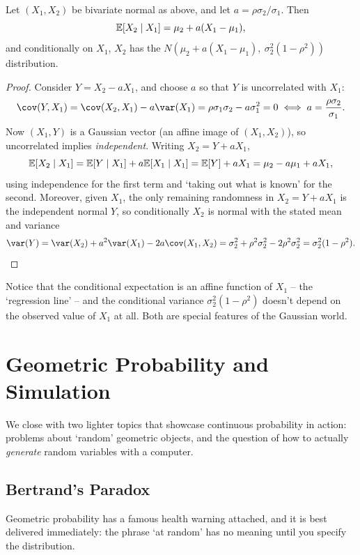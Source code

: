 \documentclass[a4paper]{scrartcl}
\begin{document}
\begin{proposition}
	Let $(X_1, X_2)$ be bivariate normal as above, and let $a = \rho\sigma_2/\sigma_1$. Then
	$$
	\mathbb{E}[X_2 \mid X_1] = \mu_2 + a(X_1 - \mu_1),
	$$
	and conditionally on $X_1$, $X_2$ has the $N\!\left(\mu_2 + a(X_1 - \mu_1),\ \sigma_2^2(1 - \rho^2)\right)$ distribution.
\end{proposition}
\begin{proof}
	Consider $Y = X_2 - aX_1$, and choose $a$ so that $Y$ is uncorrelated with $X_1$:
	$$
	\cov(Y, X_1) = \cov(X_2, X_1) - a\var(X_1) = \rho\sigma_1\sigma_2 - a\sigma_1^2 = 0 \iff a = \frac{\rho\sigma_2}{\sigma_1}.
	$$
	Now $(X_1, Y)$ is a Gaussian vector (an affine image of $(X_1, X_2)$), so uncorrelated implies \emph{independent}. Writing $X_2 = Y + aX_1$,
	$$
	\mathbb{E}[X_2 \mid X_1] = \mathbb{E}[Y \mid X_1] + a\mathbb{E}[X_1 \mid X_1] = \mathbb{E}[Y] + aX_1 = \mu_2 - a\mu_1 + aX_1,
	$$
	using independence for the first term and `taking out what is known' for the second. Moreover, given $X_1$, the only remaining randomness in $X_2 = Y + aX_1$ is the independent normal $Y$, so conditionally $X_2$ is normal with the stated mean and variance
	$$
	\var(Y) = \var(X_2) + a^2\var(X_1) - 2a\cov(X_1, X_2) = \sigma_2^2 + \rho^2\sigma_2^2 - 2\rho^2\sigma_2^2 = \sigma_2^2(1 - \rho^2). \qedhere
	$$
\end{proof}

Notice that the conditional expectation is an affine function of $X_1$ -- the `regression line' -- and the conditional variance $\sigma_2^2(1 - \rho^2)$ doesn't depend on the observed value of $X_1$ at all. Both are special features of the Gaussian world.


\section{Geometric Probability and Simulation}

We close with two lighter topics that showcase continuous probability in action: problems about `random' geometric objects, and the question of how to actually \emph{generate} random variables with a computer.

\subsection{Bertrand's Paradox}

Geometric probability has a famous health warning attached, and it is best delivered immediately: the phrase `at random' has no meaning until you specify the distribution.
\end{document}
